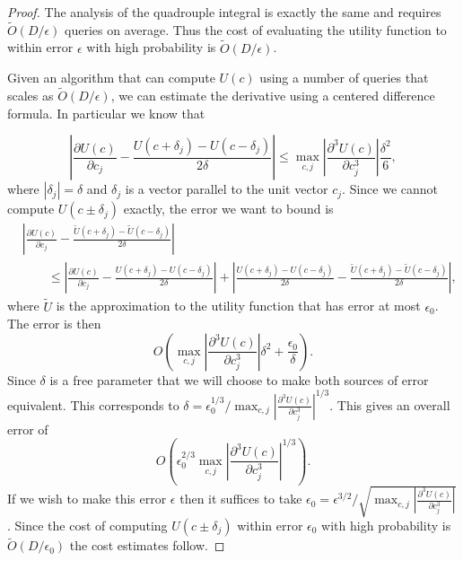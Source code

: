 \documentclass[aps,amsmath,onecolumn,amssymb,notitlepage]{revtex4-1}
\begin{document}
\begin{proof}
The analysis of the quadrouple integral is exactly the same and requires $\tilde O(D/\epsilon)$ queries on average.  Thus the cost of evaluating the utility function to within error $\epsilon$ with high probability is $\tilde O(D/\epsilon)$.  

Given an algorithm that can compute $U(c)$ using a number of queries that scales as $\tilde{O}(D/\epsilon)$, we can estimate the derivative using a centered difference formula.  In particular we know that

\begin{equation}
\left|\frac{\partial U(c)}{\partial c_j}-\frac{U(c+\delta_j)-U(c-\delta_j)}{2\delta} \right|\le \max_{c,j} \left|\frac{\partial^3 U(c)}{\partial c_j^3} \right|\frac{\delta^2}{6},
\end{equation}
where $|\delta_j|=\delta$ and $\delta_j$ is a vector parallel to the unit vector $c_j$.
Since we cannot compute $U(c\pm\delta_j)$ exactly, the error we want to bound is
\begin{align}
&\left|\frac{\partial U(c)}{\partial c_j}-\frac{\tilde U(c+\delta_j)-\tilde U(c-\delta_j)}{2\delta} \right|\nonumber \\
&\qquad \le \left|\frac{\partial U(c)}{\partial c_j}-\frac{ U(c+\delta_j)- U(c-\delta_j)}{2\delta} \right|+\left|\frac{ U(c+\delta_j)- U(c-\delta_j)}{2\delta}-\frac{ \tilde U(c+\delta_j)- \tilde U(c-\delta_j)}{2\delta} \right|,
\end{align}
where $\tilde U$ is the approximation to the utility function that has error at most $\epsilon_0$.  The error is then
\begin{equation}
O\left(\max_{c,j} \left|\frac{\partial^3 U(c)}{\partial c_j^3} \right|{\delta^2}+\frac{\epsilon_0}{\delta}\right).
\end{equation}
Since $\delta$ is a free parameter that we will choose to make both sources of error equivalent.  This corresponds to $\delta= \epsilon_0^{1/3}/\max_{c,j} \left|\frac{\partial^3 U(c)}{\partial c_j^3} \right|^{1/3}$.  This gives an overall error of
\begin{equation}
O\left({\epsilon_0^{2/3}}{\max_{c,j}\left|\frac{\partial^3 U(c)}{\partial c_j^3} \right|^{1/3}} \right).
\end{equation}
If we wish to make this error $\epsilon$ then it suffices to take $\epsilon_0 = \epsilon^{3/2}/\sqrt{\max_{c,j}\left|\frac{\partial^3 U(c)}{\partial c_j^3} \right|}$.  Since the cost of computing $U(c\pm \delta_j)$ within error $\epsilon_0$ with high probability is $\tilde O(D/\epsilon_0)$ the cost estimates follow.
\end{proof}
\end{document}
